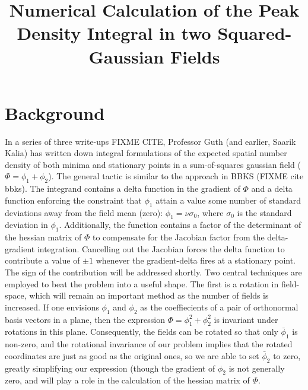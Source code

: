 \documentclass[10pt,letterpaper]{article}
\title{Numerical Calculation of the Peak Density Integral in two Squared-Gaussian Fields}
\begin{document}
\maketitle

\section{Background}

In a series of three write-ups FIXME CITE, Professor Guth (and earlier, Saarik Kalia) has written down integral formulations of the expected spatial number density of both minima and stationary points in a sum-of-squares gaussian field ($\Phi = \phi_1 + \phi_2$). The general tactic is similar to the approach in BBKS (FIXME cite bbks). The integrand contains a delta function in the gradient of $\Phi$ and a delta function enforcing the constraint that $\phi_1$ attain a value some number of standard deviations away from the field mean (zero): $\phi_1 = \nu \sigma_0$, where $\sigma_0$ is the standard deviation in $\phi_1$. Additionally, the function contains a factor of the determinant of the hessian matrix of $\Phi$ to compensate for the Jacobian factor from the delta-gradient integration. Cancelling out the Jacobian forces the delta function to contribute a value of $\pm 1$ whenever the gradient-delta fires at a stationary point. The sign of the contribution will be addressed shortly. Two central techniques are employed to beat the problem into a useful shape. The first is a rotation in field-space, which will remain an important method as the number of fields is increased. If one envisions $\phi_1$ and $\phi_2$ as the coeffiecients of a pair of orthonormal basis vectors in a plane, then the expression $\Phi = \phi_1^2 + \phi_2^2$ is invariant under rotations in this plane. Consequently, the fields can be rotated so that only $\bar{\phi}_1$ is non-zero, and the rotational invariance of our problem implies that the rotated coordinates are just as good as the original ones, so we are able to set $\bar{\phi}_2$ to zero, greatly simplifying our expression (though the gradient of $\phi_2$ is not generally zero, and will play a role in the calculation of the hessian matrix of $\Phi$. 
\end{document}
